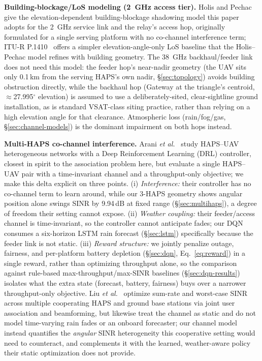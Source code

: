 \documentclass[]{ieeeaccess}
\begin{document}
\textbf{Building-blockage/LoS modeling (2~GHz access tier).} Holis and Pechac~\cite{holispechac2008} give the elevation-dependent building-blockage shadowing model this paper adopts for the 2~GHz service link and the relay's access hop, originally formulated for a single serving platform with no co-channel interference term; ITU-R P.1410~\cite{itu_p1410} offers a simpler elevation-angle-only LoS baseline that the Holis--Pechac model refines with building geometry. The 38~GHz backhaul/feeder link does not need this model: the feeder hop's near-nadir geometry (the UAV sits only 0.1\,km from the serving HAPS's own nadir, \S\ref{sec:topology}) avoids building obstruction directly, while the backhaul hop (Gateway at the triangle's centroid, $\approx$27.995$^\circ$ elevation) is assumed to use a deliberately-sited, clear-sightline ground installation, as is standard VSAT-class siting practice, rather than relying on a high elevation angle for that clearance. Atmospheric loss (rain/fog/gas, \S\ref{sec:channel-models}) is the dominant impairment on both hops instead.

\textbf{Multi-HAPS co-channel interference.} Arani \emph{et al.}~\cite{arani2023} study HAPS--UAV heterogeneous networks with a Deep Reinforcement Learning (DRL) controller, closest in spirit to the association problem here, but evaluate a single HAPS--UAV pair with a time-invariant channel and a throughput-only objective; we make this delta explicit on three points. (i) \emph{Interference:} their controller has no co-channel term to learn around, while our 3-HAPS geometry shows angular position alone swings SINR by 9.94\,dB at fixed range (\S\ref{sec:multihaps}), a degree of freedom their setting cannot expose. (ii) \emph{Weather coupling:} their feeder/access channel is time-invariant, so the controller cannot anticipate fades; our DQN consumes a six-horizon LSTM rain forecast (\S\ref{sec:lstm}) specifically because the feeder link is not static. (iii) \emph{Reward structure:} we jointly penalize outage, fairness, and per-platform battery depletion (\S\ref{sec:dqn}, Eq.~\eqref{eq:reward}) in a single reward, rather than optimizing throughput alone, so the comparison against rule-based max-throughput/max-SINR baselines (\S\ref{sec:dqn-results}) isolates what the extra state (forecast, battery, fairness) buys over a narrower throughput-only objective. Liu \emph{et al.}~\cite{liu2026multihaps} optimize sum-rate and worst-case SINR across multiple cooperating HAPS and ground base stations via joint user association and beamforming, but likewise treat the channel as static and do not model time-varying rain fades or an onboard forecaster; our channel model instead quantifies the \emph{angular} SINR heterogeneity this cooperative setting would need to counteract, and complements it with the learned, weather-aware policy their static optimization does not provide.
\end{document}
